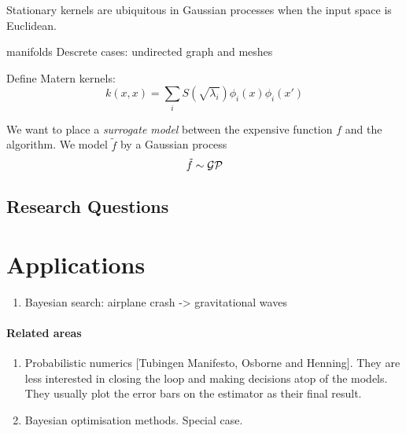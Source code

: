 Stationary kernels are ubiquitous in Gaussian processes when the input space is Euclidean. 


manifolds 
Descrete cases: undirected graph and meshes

Define Matern kernels:
\begin{equation}
    k(x, x) = \sum_i S(\sqrt{\lambda_i}) \phi_i(x) \phi_i(x')
\end{equation}

We want to place a \emph{surrogate model} between the expensive function $f$ and the algorithm. We model $\tilde{f}$ by a Gaussian process
\begin{equation}
    \tilde{f} \sim \mathcal{GP}
\end{equation}

\subsection{Research Questions}


\section{Applications}

\begin{enumerate}
    \item Bayesian search: airplane crash -> gravitational waves
\end{enumerate}



\paragraph{Related areas}
\begin{enumerate}
    \item Probabilistic numerics [Tubingen Manifesto, Osborne and Henning]. They are less interested in closing the loop and making decisions atop of the models. They usually plot the error bars on the estimator as their final result.
    \item Bayesian optimisation methods. Special case.
\end{enumerate}

